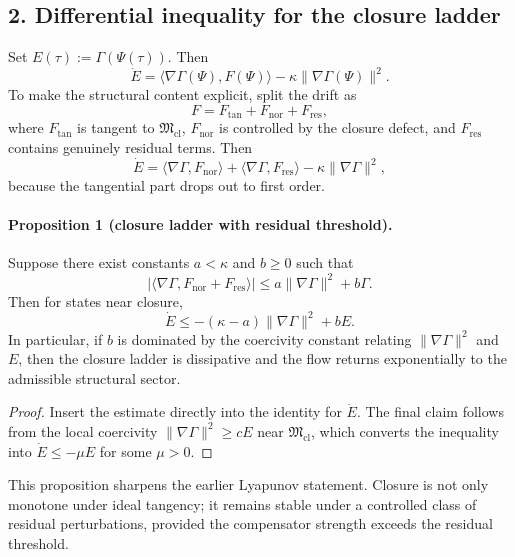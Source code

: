 \subsection*{2. Differential inequality for the closure ladder}
Set $E(\tau):=\Gamma(\Psi(\tau))$. Then
\[
\dot E = \langle \nabla\Gamma(\Psi),F(\Psi)\rangle - \kappa\|\nabla\Gamma(\Psi)\|^2.
\]
To make the structural content explicit, split the drift as
\[
F = F_{\mathrm{tan}} + F_{\mathrm{nor}} + F_{\mathrm{res}},
\]
where $F_{\mathrm{tan}}$ is tangent to $\mathfrak M_{\mathrm{cl}}$, $F_{\mathrm{nor}}$ is
controlled by the closure defect, and $F_{\mathrm{res}}$ contains genuinely residual
terms. Then
\[
\dot E
= \langle \nabla\Gamma,F_{\mathrm{nor}}\rangle
 + \langle \nabla\Gamma,F_{\mathrm{res}}\rangle
 - \kappa\|\nabla\Gamma\|^2,
\]
because the tangential part drops out to first order.

\paragraph{Proposition 1 (closure ladder with residual threshold).}
Suppose there exist constants $a<\kappa$ and $b\ge 0$ such that
\[
|\langle \nabla\Gamma,F_{\mathrm{nor}}+F_{\mathrm{res}}\rangle|
\le a\|\nabla\Gamma\|^2 + b\Gamma.
\]
Then for states near closure,
\[
\dot E \le -(\kappa-a)\|\nabla\Gamma\|^2 + bE.
\]
In particular, if $b$ is dominated by the coercivity constant relating
$\|\nabla\Gamma\|^2$ and $E$, then the closure ladder is dissipative and the flow
returns exponentially to the admissible structural sector.

\begin{proof}
Insert the estimate directly into the identity for $\dot E$. The final claim
follows from the local coercivity
$\|\nabla\Gamma\|^2\ge cE$ near $\mathfrak M_{\mathrm{cl}}$, which converts the
inequality into $\dot E\le -\mu E$ for some $\mu>0$.
\end{proof}

This proposition sharpens the earlier Lyapunov statement. Closure is not only
monotone under ideal tangency; it remains stable under a controlled class of
residual perturbations, provided the compensator strength exceeds the residual
threshold.

